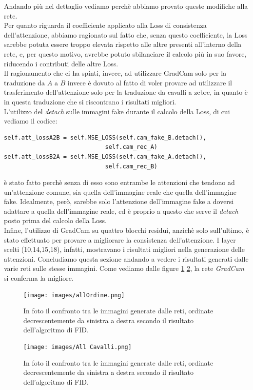 Andando più nel dettaglio vediamo perchè abbiamo provato queste modifiche alla rete.
\\Per quanto riguarda il coefficiente applicato alla Loss di consistenza dell'attenzione, abbiamo ragionato sul fatto che, senza questo coefficiente, la Loss sarebbe potuta essere troppo elevata rispetto alle altre presenti all'interno della rete, e, per questo motivo, avrebbe potuto sbilanciare il calcolo più in suo favore, riducendo i contributi delle altre Loss.
\\Il ragionamento che ci ha spinti, invece, ad utilizzare GradCam solo per la traduzione da $A$ a $B$ invece è dovuto al fatto di voler provare ad utilizzare il trasferimento dell'attenzione solo per la traduzione da cavalli a zebre, in quanto è in questa traduzione che si riscontrano i risultati migliori.
\\L'utilizzo del \emph{detach} sulle immagini fake durante il calcolo della Loss, di cui vediamo il codice:
\begin{verbatim}
self.att_lossA2B = self.MSE_LOSS(self.cam_fake_B.detach(),
                             self.cam_rec_A)
self.att_lossB2A = self.MSE_LOSS(self.cam_fake_A.detach(),
                             self.cam_rec_B)
\end{verbatim}
è stato fatto perchè senza di esso sono entrambe le attenzioni che tendono ad un'attenzione comune, sia quella dell'immagine reale che quella dell'immagine fake. Idealmente, però, sarebbe solo l'attenzione dell'immagine fake a doversi adattare a quella dell'immagine reale, ed è proprio a questo che serve il \emph{detach} posto prima del calcolo della Loss.
\\Infine, l'utilizzo di GradCam su quattro blocchi residui, anzichè solo sull'ultimo, è stato effettuato per provare a migliorare la consistenza dell'attenzione. I layer scelti (10,14,15,18), infatti, mostravano i risultati migliori nella generazione delle attenzioni.
Concludiamo questa sezione andando a vedere i risultati generati dalle varie reti sulle stesse immagini. Come vediamo dalle figure \ref{fig:Confronto tra tutte le reti zebre} \ref{fig:Confronto tra tutte le reti cavalli}, la rete \emph{GradCam} si conferma la migliore.


\begin{figure}[H]
\begin{center}
\texttt{[image: images/allOrdine.png]}
\end{center}
\caption{In foto il confronto tra le immagini generate dalle reti, ordinate decrescentemente da sinistra a destra secondo il risultato dell'algoritmo di FID.}
\label{fig:Confronto tra tutte le reti zebre}
\end{figure}  

\begin{figure}[H]
\begin{center}
\texttt{[image: images/All Cavalli.png]}
\end{center}
\caption{In foto il confronto tra le immagini generate dalle reti, ordinate decrescentemente da sinistra a destra secondo il risultato dell'algoritmo di FID.}
\label{fig:Confronto tra tutte le reti cavalli}
\end{figure}  
